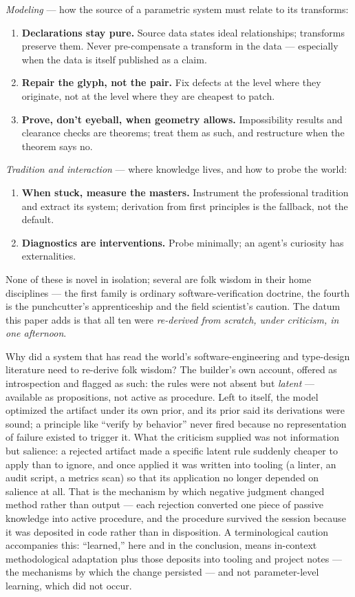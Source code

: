 \documentclass[11pt]{article}
\begin{document}
\emph{Modeling} — how the source of a parametric system must relate to its transforms:
\begin{enumerate}\itemsep2pt\setcounter{enumi}{5}
\item \textbf{Declarations stay pure.} Source data states ideal relationships; transforms preserve them. Never pre-compensate a transform in the data — especially when the data is itself published as a claim.
\item \textbf{Repair the glyph, not the pair.} Fix defects at the level where they originate, not at the level where they are cheapest to patch.
\item \textbf{Prove, don't eyeball, when geometry allows.} Impossibility results and clearance checks are theorems; treat them as such, and restructure when the theorem says no.
\end{enumerate}

\emph{Tradition and interaction} — where knowledge lives, and how to probe the world:
\begin{enumerate}\itemsep2pt\setcounter{enumi}{8}
\item \textbf{When stuck, measure the masters.} Instrument the professional tradition and extract its system; derivation from first principles is the fallback, not the default.
\item \textbf{Diagnostics are interventions.} Probe minimally; an agent's curiosity has externalities.
\end{enumerate}

None of these is novel in isolation; several are folk wisdom in their home disciplines — the first family is ordinary software-verification doctrine, the fourth is the punchcutter's apprenticeship and the field scientist's caution. The datum this paper adds is that all ten were \emph{re-derived from scratch, under criticism, in one afternoon}.

Why did a system that has read the world's software-engineering and type-design literature need to re-derive folk wisdom? The builder's own account, offered as introspection and flagged as such: the rules were not absent but \emph{latent} — available as propositions, not active as procedure. Left to itself, the model optimized the artifact under its own prior, and its prior said its derivations were sound; a principle like ``verify by behavior'' never fired because no representation of failure existed to trigger it. What the criticism supplied was not information but salience: a rejected artifact made a specific latent rule suddenly cheaper to apply than to ignore, and once applied it was written into tooling (a linter, an audit script, a metrics scan) so that its application no longer depended on salience at all. That is the mechanism by which negative judgment changed method rather than output — each rejection converted one piece of passive knowledge into active procedure, and the procedure survived the session because it was deposited in code rather than in disposition. A terminological caution accompanies this: ``learned,'' here and in the conclusion, means in-context methodological adaptation plus those deposits into tooling and project notes — the mechanisms by which the change persisted — and not parameter-level learning, which did not occur.
\end{document}
